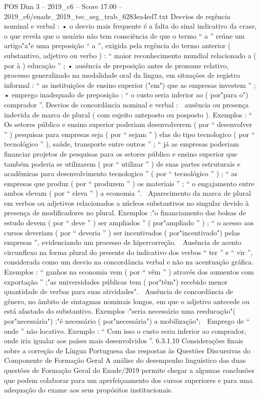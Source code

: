 \begin{textsample}{POS Dim 3 – 2019\_c6 – Score 17.00 – 2019\_c6/enade\_2019\_tec\_seg\_trab\_6283ea4ed7.txt}
Desvios de regência nominal e verbal : • o desvio mais frequente é a falta do sinal indicativo da crase, o que revela que o usuário não tem consciência de que o termo “ a ” reúne um artigo"a"e uma preposição “ a ”, exigida pela regência do termo anterior ( substantivo, adjetivo ou verbo ) : “ maior reconhecimento mundial relacionado a ( por à ) educação ” ; • ausência de preposição antes de pronome relativo, processo generalizado na modalidade oral da língua, em situações de registro informal : “ as instituições de ensino superior ("em") que as empresas investem ” ; • emprego inadequado de preposição : “ o custo seria inferior ao ( por"para o") comprador ”.
Desvios de concordância nominal e verbal :  ausência ou presença indevida de marca de plural ( com sujeito anteposto ou posposto ).
Exemplos : “ Os setores público e ensino superior poderiam desenvolverem ( por “ desenvolver ” ) pesquisas para empresas seja ( por “ sejam ” ) elas do tipo tecnologico ( por “ tecnológico ” ), saúde, transporte entre outros ” ; “ já as empresas poderiam financiar projetos de pesquisas para os setores público e ensino superior que também poderia se utilizarem ( por “ utilizar ” ) de suas partes estruturais e acadêmicas para desenvolvimento tecnologico ” ( por “ tecnológico ” ) ; “ as empresas que produz ( por “ produzem ” ) os materiais ” ; “ o engajamento entre ambos elevam ( por “ eleva ” ) a economia ”.  Aparecimento da marca de plural em verbos ou adjetivos relacionados a núcleos substantivos no singular devido à presença de modificadores no plural.
Exemplos :"o financiamento das bolsas de estudo devem ( por “ deve ” ) ser ampliados ” ( por"ampliado ” ) ; “ o acesso aos cursos deveriam ( por “ deveria ” ) ser incentivados ( por"incentivado") pelas empresas ”, evidenciando um processo de hipercorreção.  Ausência de acento circunflexo na forma plural do presente do indicativo dos verbos “ ter ” e “ vir ”, considerada como um desvio na concordância verbal e não na acentuação gráfica.
Exemplos : “ ganhos na economia vem ( por “ vêm ” ) através dos aumentos com exportação ” ;"as universidades públicas tem ( por"têm") recebido menor quantidade de verbas para suas atividades".  Ausência de concordância de gênero, no âmbito de sintagmas nominais longos, em que o adjetivo antecede ou está afastado do substantivo.
Exemplos :"seria necessário uma reeducação"( por"necessária") ;"é necessário ( por"necessária") a mobilização";  Emprego de “ onde ” não locativo.
Exemplo : “ Com isso o custo seria inferior ao comprador, onde iria igualar aos países mais desenvolvidos ”. 6.3.1.10 Considerações finais sobre a correção de Língua Portuguesa das respostas às Questões Discursivas do Componente de Formação Geral A análise do desempenho linguístico das duas questões de Formação Geral do Enade/2019 permite chegar a algumas conclusões que podem colaborar para um aperfeiçoamento dos cursos superiores e para uma adequação do exame aos seus propósitos institucionais.

\end{textsample}
